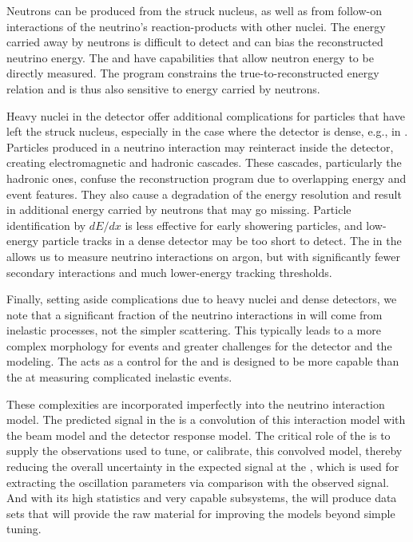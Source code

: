 Neutrons can be produced from the struck nucleus, as well as from follow-on interactions of the neutrino's reaction-products with other nuclei. The energy carried away by neutrons is difficult to detect and can bias the reconstructed neutrino energy. The  and  have capabilities that allow neutron energy to be directly measured. The  program constrains the true-to-reconstructed energy relation and is thus also sensitive to energy carried by neutrons.

Heavy nuclei in the detector offer additional complications for particles that have left the struck nucleus, especially in the case where the detector is dense, e.g., in . Particles produced in a neutrino interaction may  reinteract inside the detector, creating electromagnetic and hadronic cascades. These cascades, particularly the hadronic ones, %
confuse the reconstruction program due to overlapping energy and event features. They also cause a degradation of the energy resolution and result in additional energy carried by neutrons that may go missing. Particle identification by $dE/dx$ is less effective for early showering particles, and  low-energy particle tracks in a dense detector may be too short to detect.  The  in the  
allows us to measure neutrino interactions %
on argon, but with significantly fewer secondary interactions and much lower-energy tracking thresholds.



Finally, setting aside complications due to heavy nuclei and dense detectors, we note that a significant fraction of the neutrino interactions in  will come from inelastic processes, not the simpler  scattering. 
This typically leads to a more complex morphology for events and greater challenges for the detector and the modeling.  The   acts as a control for the  and is designed to be more capable than the  at measuring complicated inelastic events.

These complexities are incorporated imperfectly into the neutrino interaction model. The predicted signal in the  is a convolution of this interaction model with the beam model and the detector response model.  The critical role of  the   is to supply the observations used to tune, or calibrate, this convolved model, thereby reducing the overall uncertainty in the expected signal at the , which is used for extracting the oscillation parameters via comparison with the observed signal.  And with its high statistics and very capable subsystems, the  will produce data sets that will provide the raw material for %
improving the models beyond simple tuning.  



